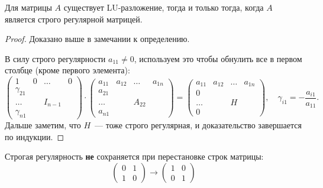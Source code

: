 \begin{theorem}
	Для матрицы $A$ существует LU-разложение, тогда и только тогда, когда $A$ является строго регулярной матрицей.

	\begin{proof}
		\circled{$\Rightarrow$} Доказано выше в замечании к определению.

		\circled{$\Leftarrow$} В силу строго регулярности $a_{11}\neq 0$, используем это чтобы обнулить все в первом
		столбце (кроме первого элемента):
		\[
			\left(
			\begin{array}{cccc}
					1           & 0 & \ldots  & 0 \\
					\gamma_{21} &                 \\
					\ldots      &   & I_{n-1}     \\
					\gamma_{n1} &
				\end{array}
			\right)\cdot
			\left(
			\begin{array}{cccc}
					a_{11} & a_{12} & \ldots & a_{1n} \\
					a_{21} &                          \\
					\ldots &        & A_{22}          \\
					a_{n1}
				\end{array}
			\right) =
			\left(
			\begin{array}{cccc}
					a_{11} & a_{12} & \ldots & a_{1n} \\
					0      &                          \\
					\ldots &        & H               \\
					0
				\end{array}
			\right),
			\quad \gamma_{i1}=-\dfrac{a_{i1}}{a_{11}}.
		\]
		Дальше заметим, что $H$~--- тоже строго регулярная, и доказательство завершается по индукции.

	\end{proof}
\end{theorem}

\begin{exercise}
	Строгая регулярность \textbf{не} сохраняется при перестановке строк матрицы:
	\[
		\left(
		\begin{array}{cc}
				0 & 1 \\
				1 & 0
			\end{array}
		\right)\rightarrow
		\left(
		\begin{array}{cc}
				1 & 0 \\
				0 & 1
			\end{array}
		\right)
	\]
\end{exercise}

